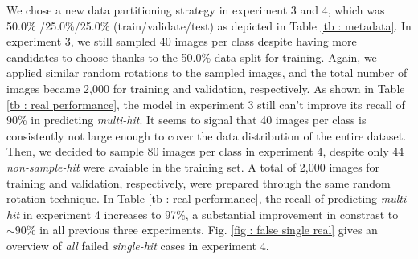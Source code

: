 We chose a new data partitioning strategy in experiment 3 and 4, which was 50.0\%
/25.0\%/25.0\% (train/validate/test) as depicted in Table \ref{tb : metadata}.
In experiment 3, we still sampled 40 images per class despite having more
candidates to choose thanks to the 50.0\% data split for training.  Again, we
applied similar random rotations to the sampled images, and the total number of
images became 2,000 for training and validation, respectively.  As shown in Table
\ref{tb : real performance}, the model in experiment 3 still can't improve its
recall of 90\% in predicting \textit{multi-hit}.  It seems to signal that 40
images per class is consistently not large enough to cover the data distribution
of the entire dataset.  Then, we decided to sample 80 images per class in
experiment 4, despite only 44 \textit{non-sample-hit} were avaiable in the
training set.  A total of 2,000 images for training and validation, respectively,
were prepared through the same random rotation technique.  In Table \ref{tb :
real performance}, the recall of predicting \textit{multi-hit} in experiment 4
increases to 97\%, a substantial improvement in constrast to $\sim 90\%$ in all
previous three experiments.  Fig. \ref{fig : false single real} gives an
overview of \textit{all} failed \textit{single-hit} cases in experiment 4.



